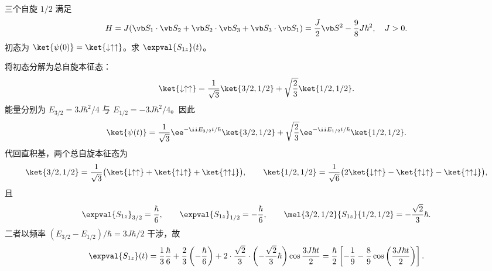 \begin{question}
三个自旋 $1/2$ 满足
\[
  H=J(\vb S_1\cdot\vb S_2+\vb S_2\cdot\vb S_3+\vb S_3\cdot\vb S_1)
  ={J\over2}\vb S^2-{9\over8}J\hbar^2,\quad J>0.
\]
初态为 $\ket{\psi(0)}=\ket{\downarrow\uparrow\uparrow}$。求 $\expval{S_{1z}}(t)$。
\begin{solution}
将初态分解为总自旋本征态：
\[
  \ket{\downarrow\uparrow\uparrow}
  ={1\over\sqrt3}\ket{3/2,1/2}
  +\sqrt{2\over3}\ket{1/2,1/2}.
\]
能量分别为 $E_{3/2}=3J\hbar^2/4$ 与 $E_{1/2}=-3J\hbar^2/4$。因此
\[
  \ket{\psi(t)}={1\over\sqrt3}\ee^{-\ii E_{3/2}t/\hbar}\ket{3/2,1/2}
  +\sqrt{2\over3}\ee^{-\ii E_{1/2}t/\hbar}\ket{1/2,1/2}.
\]
代回直积基，两个总自旋本征态为
\[
  \ket{3/2,1/2}={1\over\sqrt3}\bigl(\ket{\downarrow\uparrow\uparrow}
  +\ket{\uparrow\downarrow\uparrow}+\ket{\uparrow\uparrow\downarrow}\bigr),\qquad
  \ket{1/2,1/2}={1\over\sqrt6}\bigl(2\ket{\downarrow\uparrow\uparrow}
  -\ket{\uparrow\downarrow\uparrow}-\ket{\uparrow\uparrow\downarrow}\bigr),
\]
且
\[
  \expval{S_{1z}}_{3/2}={\hbar\over6},\qquad
  \expval{S_{1z}}_{1/2}=-{\hbar\over6},\qquad
  \mel{3/2,1/2}{S_{1z}}{1/2,1/2}=-{\sqrt2\over3}\hbar.
\]
二者以频率 $(E_{3/2}-E_{1/2})/\hbar=3J\hbar/2$ 干涉，故
\[
  \expval{S_{1z}}(t)={1\over3}{\hbar\over6}+{2\over3}\left(-{\hbar\over6}\right)
  +2\cdot{\sqrt2\over3}\cdot\left(-{\sqrt2\over3}\hbar\right)\cos{3J\hbar t\over2}
  ={\hbar\over2}\left[-{1\over9}
  -{8\over9}\cos\left({3J\hbar t\over2}\right)\right].
\]
\end{solution}
\end{question}

